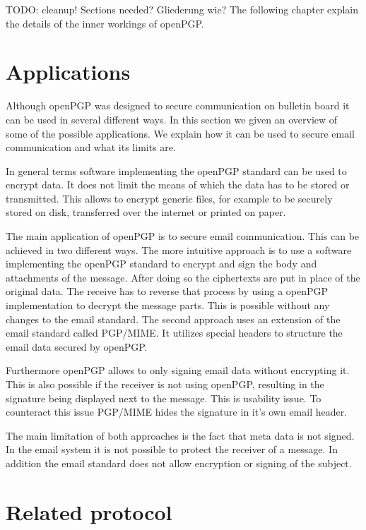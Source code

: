 TODO: cleanup! Sections needed? Gliederung wie?
The following chapter explain the details of the inner workings of openPGP.

\section{Applications} \label{section:openpgp:smime}

Although openPGP was designed to secure communication on bulletin board it can be used in several different ways. In this section we given an overview of some of the possible applications. We explain how it can be used to secure email communication and what its limits are. 


In general terms software implementing the openPGP standard can be used to encrypt data. It does not limit the means of which the data has to be stored or transmitted. This allows to encrypt generic files, for example to be securely stored on disk, transferred over the internet or printed on paper.  


The main application of openPGP is to secure email communication. This can be achieved in two different ways. The more intuitive approach is to use a software implementing the openPGP standard to encrypt and sign the body and attachments of the message. After doing so the ciphertexts are put in place of the original data. The receive has to reverse that process by using a openPGP implementation to decrypt the message parts. This is possible without any changes to the email standard. The second approach uses an extension of the email standard called PGP/MIME. It utilizes special headers to structure the email data secured by openPGP.

Furthermore openPGP allows to only signing email data without encrypting it. This is also possible if the receiver is not using openPGP, resulting in the signature being displayed next to the message. This is usability issue. To counteract this issue PGP/MIME hides the signature in it's own email header.


The main limitation of both approaches is the fact that meta data is not signed. In the email system it is not possible to protect the receiver of a message. In addition the email standard does not allow encryption or signing of the subject.

\section{Related protocol} \label{section:openpgp:smime}


